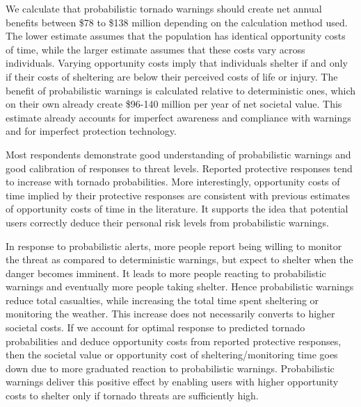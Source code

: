 \documentclass{ametsocV6.1}
\begin{document}
We calculate that probabilistic tornado warnings should create net annual benefits between \$78 to \$138 million depending on the calculation method used. The lower estimate assumes that the population has identical opportunity costs of time, while the larger estimate assumes that these costs vary across individuals. Varying opportunity costs imply that individuals shelter if and only if their costs of sheltering are below their perceived costs of life or injury. The benefit of probabilistic warnings is calculated relative to deterministic ones, which on their own already create \$96-140 million per year of net societal value.  This estimate already accounts for imperfect awareness and compliance with warnings and for imperfect protection technology.

Most respondents demonstrate good understanding of probabilistic warnings and good calibration of responses to threat levels. Reported protective responses tend to increase with tornado probabilities. More interestingly, opportunity costs of time implied by their protective responses are consistent with previous estimates of opportunity costs of time in the literature. It supports the idea that potential users correctly deduce their personal risk levels from probabilistic warnings. 

In response to probabilistic alerts, more people report being willing to monitor the threat as compared to deterministic warnings, but expect to shelter when the danger becomes imminent.  It leads to more people reacting to probabilistic warnings and eventually more people taking shelter. Hence probabilistic warnings reduce total casualties, while increasing the total time spent sheltering or monitoring the weather. This increase does not necessarily converts to higher societal costs. If we account for optimal response to predicted tornado probabilities and deduce opportunity costs from reported protective responses, then the societal value or opportunity cost of sheltering/monitoring time goes down due to more graduated reaction to probabilistic warnings. Probabilistic warnings deliver this positive effect by enabling users with higher opportunity costs to shelter only if tornado threats are sufficiently high. 
\end{document}
